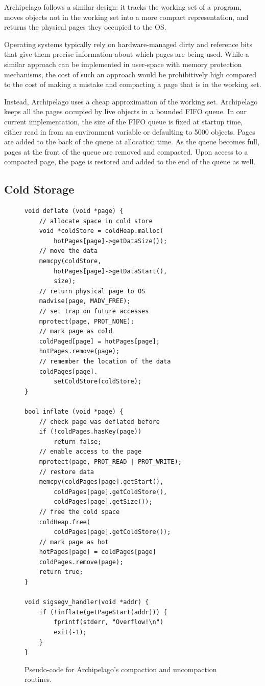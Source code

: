 \documentclass{acm_proc_article-sp}
\begin{document}
Archipelago follows a similar design: it tracks the working set of a
program, moves objects not in the working set into a more compact
representation, and returns the physical pages they occupied to the
OS.

Operating systems typically rely on hardware-managed dirty and
reference bits that give them precise information about which pages
are being used. While a similar approach can be implemented in
user-space with memory protection mechanisms, the cost of such an
approach would be prohibitively high compared to the cost of making a
mistake and compacting a page that is in the working set.

Instead, Archipelago uses a cheap approximation of the working
set. Archipelago keeps all the pages occupied by live objects in a
bounded FIFO queue. In our current implementation, the size of the
FIFO queue is fixed at startup time, either read in from an
environment variable or defaulting to 5000 objects. Pages are added to
the back of the queue at allocation time. As the queue becomes full,
pages at the front of the queue are removed and compacted. Upon access
to a compacted page, the page is restored and added to the end of the
queue as well.

\subsection{Cold Storage}
\label{sec:cold}

\begin{figure}[!t]
\label{fig:compact}
\begin{lstlisting}
void deflate (void *page) {
	// allocate space in cold store
	void *coldStore = coldHeap.malloc(
		hotPages[page]->getDataSize());
	// move the data
	memcpy(coldStore, 
		hotPages[page]->getDataStart(), 
		size);
	// return physical page to OS
	madvise(page, MADV_FREE);
	// set trap on future accesses
	mprotect(page, PROT_NONE);
	// mark page as cold
	coldPaged[page] = hotPages[page];
	hotPages.remove(page);
	// remember the location of the data
	coldPages[page].
		setColdStore(coldStore);
}

bool inflate (void *page) {
	// check page was deflated before
	if (!coldPages.hasKey(page))
		return false;
	// enable access to the page
	mprotect(page, PROT_READ | PROT_WRITE);
	// restore data
	memcpy(coldPages[page].getStart(),
		coldPages[page].getColdStore(),
		coldPages[page].getSize());
	// free the cold space
	coldHeap.free(
		coldPages[page].getColdStore());
	// mark page as hot
	hotPages[page] = coldPages[page]
	coldPages.remove(page);
	return true;
}

void sigsegv_handler(void *addr) {
	if (!inflate(getPageStart(addr))) {
		fprintf(stderr, "Overflow!\n")
		exit(-1);
	}
} 
\end{lstlisting}
\caption{Pseudo-code for Archipelago's compaction and uncompaction routines.}
\end{figure}
\end{document}
